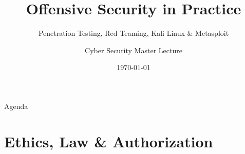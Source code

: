 \documentclass[aspectratio=169,11pt]{beamer}
\title{Offensive Security in Practice}
\subtitle{Penetration Testing, Red Teaming, Kali Linux \& Metasploit}
\author{Cyber Security Master Lecture}
\institute{Prof. Dr. Sebastian Schlesinger, HWR Berlin}
\date{\today}
\begin{document}
\begin{frame}[plain]
  \titlepage
\end{frame}


\begin{frame}{Agenda}
  \tableofcontents
\end{frame}

\section{Ethics, Law \& Authorization}
\end{document}
